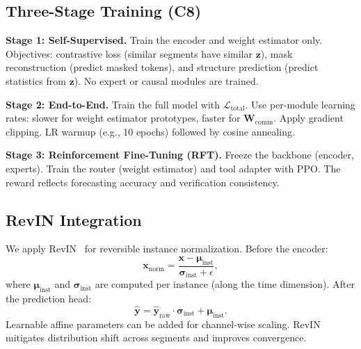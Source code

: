\subsection{Three-Stage Training (C8)}
\label{sec:training}

\textbf{Stage 1: Self-Supervised.} Train the encoder and weight estimator only. Objectives: contrastive loss (similar segments have similar $\mathbf{z}$), mask reconstruction (predict masked tokens), and structure prediction (predict statistics from $\mathbf{z}$). No expert or causal modules are trained.

\textbf{Stage 2: End-to-End.} Train the full model with $\mathcal{L}_{\text{total}}$. Use per-module learning rates: slower for weight estimator prototypes, faster for $\mathbf{W}_{\text{comm}}$. Apply gradient clipping. LR warmup (e.g., 10 epochs) followed by cosine annealing.

\textbf{Stage 3: Reinforcement Fine-Tuning (RFT).} Freeze the backbone (encoder, experts). Train the router (weight estimator) and tool adapter with PPO. The reward reflects forecasting accuracy and verification consistency.

\subsection{RevIN Integration}
\label{sec:revin}

We apply RevIN~\cite{kim2022reversible} for reversible instance normalization. Before the encoder:
\begin{equation}
\mathbf{x}_{\text{norm}} = \frac{\mathbf{x} - \boldsymbol{\mu}_{\text{inst}}}{\boldsymbol{\sigma}_{\text{inst}} + \epsilon},
\end{equation}
where $\boldsymbol{\mu}_{\text{inst}}$ and $\boldsymbol{\sigma}_{\text{inst}}$ are computed per instance (along the time dimension). After the prediction head:
\begin{equation}
\hat{\mathbf{y}} = \hat{\mathbf{y}}_{\text{raw}} \cdot \boldsymbol{\sigma}_{\text{inst}} + \boldsymbol{\mu}_{\text{inst}}.
\end{equation}
Learnable affine parameters can be added for channel-wise scaling. RevIN mitigates distribution shift across segments and improves convergence.
